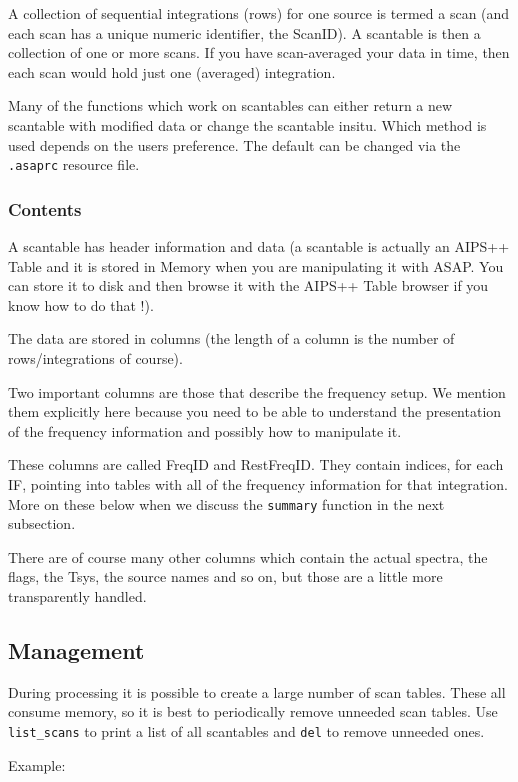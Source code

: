 \documentclass[11pt]{article}
\newcommand{\cmd}[1]{{\tt #1}}
\begin{document}
A collection of sequential integrations (rows) for one source is termed
a scan (and each scan has a unique numeric identifier, the ScanID). A
scantable is then a collection  of one or more scans. If you have
scan-averaged your data in time, then each scan would  hold just one
(averaged) integration.

Many of the functions which work on scantables can either return a
new scantable with modified data or change the scantable insitu. Which
method is used depends on the users preference. The default can be
changed via the {\tt .asaprc} resource file.

\subsubsection {Contents}

A scantable has header information and data (a scantable is actually an AIPS++
Table and it is stored in Memory when you are manipulating it with ASAP.
You can store it to disk and then browse it with the AIPS++
Table browser if you know how to do that !).

The data are stored in columns (the length of a column is the number of
rows/integrations of course).  

Two important columns are those that describe the frequency setup.  We mention
them explicitly here because you need to be able to understand the presentation
of the frequency information and possibly how to manipulate it.

These columns are called FreqID and RestFreqID.  They contain indices, for
each IF, pointing into tables with all of the frequency information for that
integration.   More on these below when we discuss the \cmd{summary} function
in the next subsection.

There are of course many other columns which contain the actual spectra,
the flags, the Tsys, the source names and so on, but those are a little
more transparently handled.

\subsection{Management}

During processing it is possible to create a large number of scan
tables. These all consume memory, so it is best to periodically remove
unneeded scan tables. Use \cmd{list\_scans} to print a list of all
scantables and \cmd{del} to remove unneeded ones.

Example:
\end{document}
